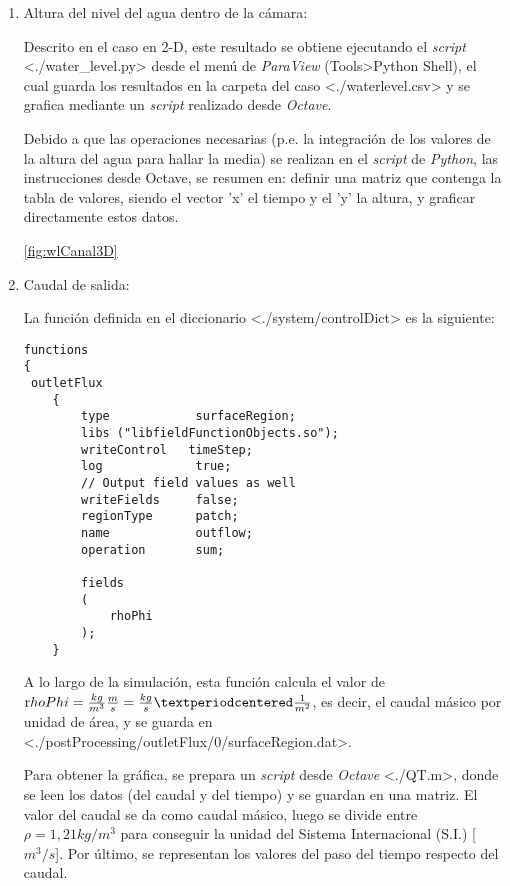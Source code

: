 \begin{enumerate}
\def\labelenumi{\arabic{enumi}.}
\item
  Altura del nivel del agua dentro de la cámara:

  Descrito en el caso en 2-D, este resultado se obtiene ejecutando el
  \emph{script} \textless{}./water\_level.py\textgreater{} desde el menú
  de \emph{ParaView} (Tools\textgreater{}Python Shell), el cual guarda
  los resultados en la carpeta del caso
  \textless{}./waterlevel.csv\textgreater{} y se grafica mediante un
  \emph{script} realizado desde \emph{Octave}.

  Debido a que las operaciones necesarias (p.e. la integración de los
  valores de la altura del agua para hallar la media) se realizan en el
  \emph{script} de \emph{Python}, las instrucciones desde Octave, se
  resumen en: definir una matriz que contenga la tabla de valores,
  siendo el vector 'x' el tiempo y el 'y' la altura, y graficar
  directamente estos datos.

  \autoref{fig:wlCanal3D}

\item
  Caudal de salida:

  La función definida en el diccionario
  \textless{}./system/controlDict\textgreater{} es la siguiente:

\begin{verbatim}
functions
{
 outletFlux
    {
        type            surfaceRegion;
        libs ("libfieldFunctionObjects.so");
        writeControl   timeStep;
        log             true;
        // Output field values as well
        writeFields     false;
        regionType      patch;
        name            outflow;
        operation       sum;

        fields
        (
            rhoPhi
        );
    }
\end{verbatim}

  A lo largo de la simulación, esta función calcula el valor de
  \(\text rhoPhi=\frac {kg}{m^3} \frac {m}{s}= \frac {kg}{s} · \frac {1}{m^2}\),
  es decir, el caudal másico por unidad de área, y se guarda en
  \textless{}./postProcessing/outletFlux/0/surfaceRegion.dat\textgreater{}.

  Para obtener la gráfica, se prepara un \emph{script} desde
  \emph{Octave} \textless{}./QT.m\textgreater{}, donde se leen los datos
  (del caudal y del tiempo) y se guardan en una matriz. El valor del
  caudal se da como caudal másico, luego se divide entre
  \(\rho=1,21kg/m^3\) para conseguir la unidad del Sistema Internacional
  (S.I.) {[}\(m^3/s\){]}. Por último, se representan los valores del
  paso del tiempo respecto del caudal.

\end{enumerate}

